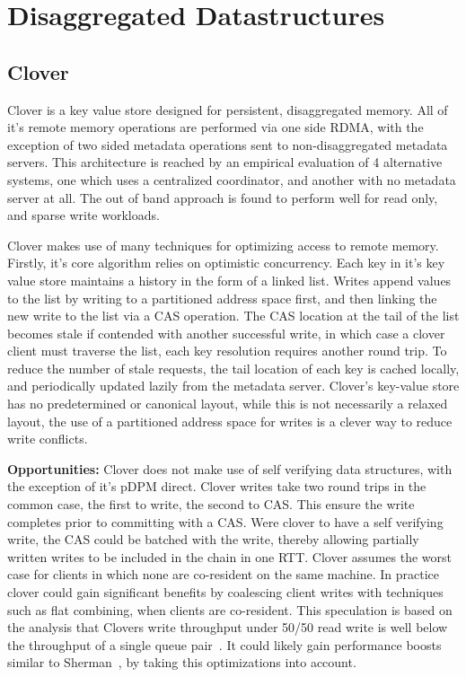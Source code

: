 \section{Disaggregated Datastructures}

\subsection{Clover}

Clover is a key value store designed for persistent, disaggregated memory. All
of it's remote memory operations are performed via one side RDMA, with the
exception of two sided metadata operations sent to non-disaggregated metadata
servers. This architecture is reached by an empirical evaluation of 4
alternative systems, one which uses a centralized coordinator, and another with
no metadata server at all. The out of band approach is found to perform well for
read only, and sparse write workloads. 

Clover makes use of many techniques for optimizing access to remote memory.
Firstly, it's core algorithm relies on optimistic concurrency. Each key in it's
key value store maintains a history in the form of a linked list. Writes append
values to the list by writing to a partitioned address space first, and then
linking the new write to the list via a CAS operation. The CAS location at the
tail of the list becomes stale if contended with another successful write, in
which case a clover client must traverse the list, each key resolution requires
another round trip. To reduce the number of stale requests, the tail location of
each key is cached locally, and periodically updated lazily from the metadata
server. Clover's key-value store has no predetermined or canonical layout, while
this is not necessarily a relaxed layout, the use of a partitioned address space
for writes is a clever way to reduce write conflicts.


\textbf{Opportunities:} Clover does not make use of self verifying data
structures, with the exception of it's pDPM direct. Clover writes take two round
trips in the common case, the first to write, the second to CAS. This ensure the
write completes prior to committing with a CAS. Were clover to have a self
verifying write, the CAS could be batched with the write, thereby allowing
partially written writes to be included in the chain in one RTT. Clover assumes
the worst case for clients in which none are co-resident on the same machine. In
practice clover could gain significant benefits by coalescing client writes with
techniques such as flat combining, when clients are co-resident. This
speculation is based on the analysis that Clovers write throughput under 50/50
read write is well below the throughput of a single queue
pair~\cite{design-guidelines}. It could likely gain performance boosts similar
to Sherman~\cite{sherman}, by taking this optimizations into account. 


